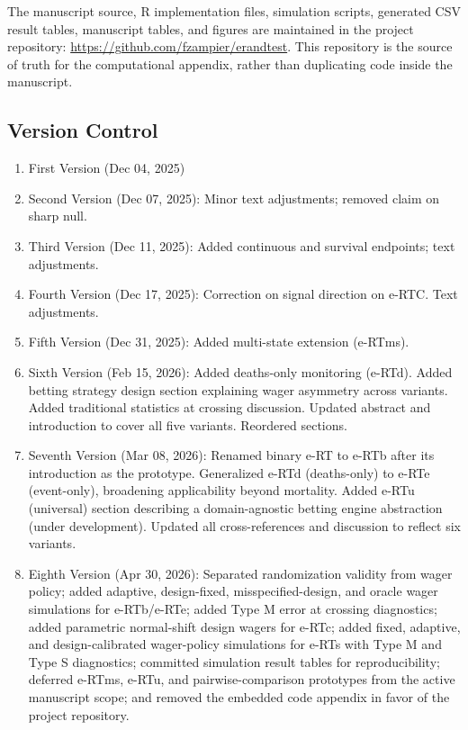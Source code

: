 \documentclass[10pt]{article}
\begin{document}
The manuscript source, R implementation files, simulation scripts, generated CSV result tables, manuscript tables, and figures are maintained in the project repository: \url{https://github.com/fzampier/erandtest}. This repository is the source of truth for the computational appendix, rather than duplicating code inside the manuscript.

\subsection{Version Control}
\begin{enumerate}
    \item First Version (Dec 04, 2025)
    \item Second Version (Dec 07, 2025): Minor text adjustments; removed claim on sharp null.
    \item Third Version (Dec 11, 2025): Added continuous and survival endpoints; text adjustments.
    \item Fourth Version (Dec 17, 2025): Correction on signal direction on e-RTC. Text adjustments.
    \item Fifth Version (Dec 31, 2025): Added multi-state extension (e-RTms).
    \item Sixth Version (Feb 15, 2026): Added deaths-only monitoring (e-RTd). Added betting strategy design section explaining wager asymmetry across variants. Added traditional statistics at crossing discussion. Updated abstract and introduction to cover all five variants. Reordered sections.
    \item Seventh Version (Mar 08, 2026): Renamed binary e-RT to e-RTb after its introduction as the prototype. Generalized e-RTd (deaths-only) to e-RTe (event-only), broadening applicability beyond mortality. Added e-RTu (universal) section describing a domain-agnostic betting engine abstraction (under development). Updated all cross-references and discussion to reflect six variants.
    \item Eighth Version (Apr 30, 2026): Separated randomization validity from wager policy; added adaptive, design-fixed, misspecified-design, and oracle wager simulations for e-RTb/e-RTe; added Type M error at crossing diagnostics; added parametric normal-shift design wagers for e-RTc; added fixed, adaptive, and design-calibrated wager-policy simulations for e-RTs with Type M and Type S diagnostics; committed simulation result tables for reproducibility; deferred e-RTms, e-RTu, and pairwise-comparison prototypes from the active manuscript scope; and removed the embedded code appendix in favor of the project repository.
\end{enumerate}



\end{document}
